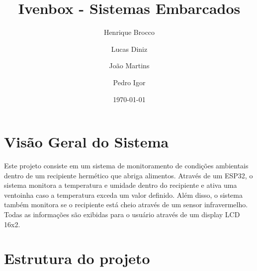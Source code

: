 \documentclass{article}
\title{Ivenbox - Sistemas Embarcados}
\author{Henrique Brocco \and Lucas Diniz \and João Martins \and Pedro Igor}
\date{\today}
\begin{document}
\maketitle
\section{Visão Geral do Sistema}
Este projeto consiste em um sistema de monitoramento de condições ambientais dentro de um recipiente hermético que abriga alimentos. Através de um ESP32, o sistema monitora a temperatura e umidade dentro do recipiente e ativa uma ventoinha caso a temperatura exceda um valor definido. Além disso, o sistema também monitora se o recipiente está cheio através de um sensor infravermelho. Todas as informações são exibidas para o usuário através de um display LCD 16x2.
\section{Estrutura do projeto}
\end{document}
